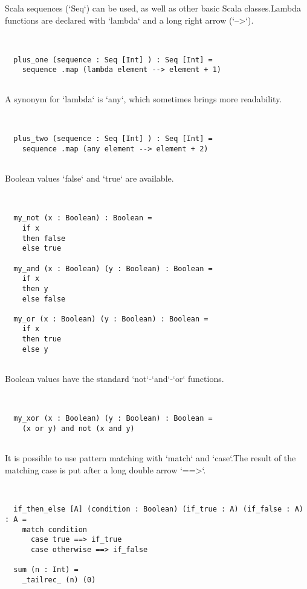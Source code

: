 \documentclass[12pt,a4paper]{article}
\begin{document}
Scala sequences (`Seq`) can be used, as well as other basic Scala classes.Lambda functions are declared with `lambda` and a long right arrow (`-->`). 


\begin{lstlisting}


  plus_one (sequence : Seq [Int] ) : Seq [Int] =
    sequence .map (lambda element --> element + 1)


\end{lstlisting}

A synonym for `lambda` is `any`, which sometimes brings more readability. 


\begin{lstlisting}


  plus_two (sequence : Seq [Int] ) : Seq [Int] =
    sequence .map (any element --> element + 2)


\end{lstlisting}

Boolean values `false` and `true` are available. 


\begin{lstlisting}


  my_not (x : Boolean) : Boolean =
    if x
    then false
    else true

  my_and (x : Boolean) (y : Boolean) : Boolean =
    if x
    then y
    else false

  my_or (x : Boolean) (y : Boolean) : Boolean =
    if x
    then true
    else y


\end{lstlisting}

Boolean values have the standard `not`-`and`-`or` functions. 


\begin{lstlisting}


  my_xor (x : Boolean) (y : Boolean) : Boolean =
    (x or y) and not (x and y)


\end{lstlisting}

It is possible to use pattern matching with `match` and `case`.The result of the matching case is put after a long double arrow `==>`. 


\begin{lstlisting}


  if_then_else [A] (condition : Boolean) (if_true : A) (if_false : A) : A =
    match condition
      case true ==> if_true
      case otherwise ==> if_false

  sum (n : Int) =
    _tailrec_ (n) (0)


\end{lstlisting}
\end{document}
